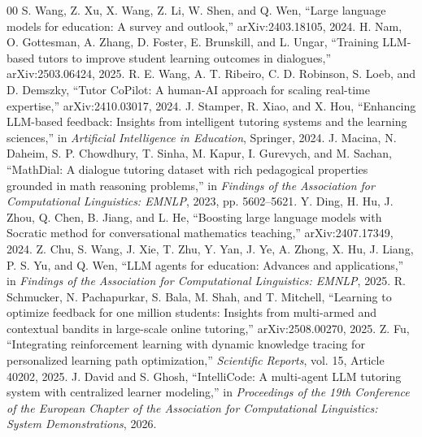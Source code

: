 \documentclass[conference]{IEEEtran}
\begin{document}
\begin{thebibliography}{00}
 S. Wang, Z. Xu, X. Wang, Z. Li, W. Shen, and Q. Wen, ``Large language models for education: A survey and outlook,'' arXiv:2403.18105, 2024.
 H. Nam, O. Gottesman, A. Zhang, D. Foster, E. Brunskill, and L. Ungar, ``Training LLM-based tutors to improve student learning outcomes in dialogues,'' arXiv:2503.06424, 2025.
 R. E. Wang, A. T. Ribeiro, C. D. Robinson, S. Loeb, and D. Demszky, ``Tutor CoPilot: A human-AI approach for scaling real-time expertise,'' arXiv:2410.03017, 2024.
 J. Stamper, R. Xiao, and X. Hou, ``Enhancing LLM-based feedback: Insights from intelligent tutoring systems and the learning sciences,'' in \emph{Artificial Intelligence in Education}, Springer, 2024.
 J. Macina, N. Daheim, S. P. Chowdhury, T. Sinha, M. Kapur, I. Gurevych, and M. Sachan, ``MathDial: A dialogue tutoring dataset with rich pedagogical properties grounded in math reasoning problems,'' in \emph{Findings of the Association for Computational Linguistics: EMNLP}, 2023, pp. 5602--5621.
 Y. Ding, H. Hu, J. Zhou, Q. Chen, B. Jiang, and L. He, ``Boosting large language models with Socratic method for conversational mathematics teaching,'' arXiv:2407.17349, 2024.
 Z. Chu, S. Wang, J. Xie, T. Zhu, Y. Yan, J. Ye, A. Zhong, X. Hu, J. Liang, P. S. Yu, and Q. Wen, ``LLM agents for education: Advances and applications,'' in \emph{Findings of the Association for Computational Linguistics: EMNLP}, 2025.
 R. Schmucker, N. Pachapurkar, S. Bala, M. Shah, and T. Mitchell, ``Learning to optimize feedback for one million students: Insights from multi-armed and contextual bandits in large-scale online tutoring,'' arXiv:2508.00270, 2025.
 Z. Fu, ``Integrating reinforcement learning with dynamic knowledge tracing for personalized learning path optimization,'' \emph{Scientific Reports}, vol. 15, Article 40202, 2025.
 J. David and S. Ghosh, ``IntelliCode: A multi-agent LLM tutoring system with centralized learner modeling,'' in \emph{Proceedings of the 19th Conference of the European Chapter of the Association for Computational Linguistics: System Demonstrations}, 2026.
\end{thebibliography}
\end{document}
